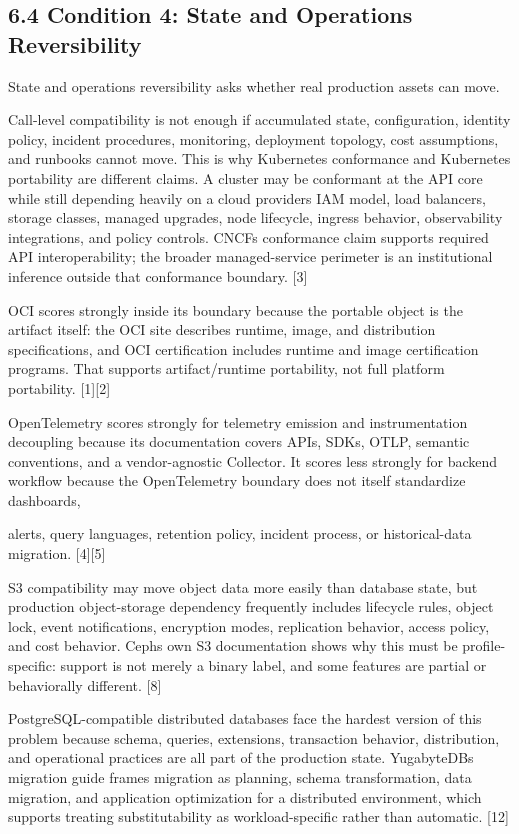 \documentclass[11pt]{article}
\begin{document}
\subsection{6.4 Condition 4: State and Operations Reversibility}\label{condition-4-state-and-operations-reversibility} State and operations reversibility asks whether real production assets can move.

Call-level compatibility is not enough if accumulated state, configuration, identity policy, incident procedures, monitoring, deployment topology, cost assumptions, and runbooks cannot move. This is why Kubernetes conformance and Kubernetes portability are different claims. A cluster may be conformant at the API core while still depending heavily on a cloud provider\textquotesingle s IAM model, load balancers, storage classes, managed upgrades, node lifecycle, ingress behavior, observability integrations, and policy controls. CNCF\textquotesingle s conformance claim supports required API interoperability; the broader managed-service perimeter is an institutional inference outside that conformance boundary. {[}3{]}

OCI scores strongly inside its boundary because the portable object is the artifact itself: the OCI site describes runtime, image, and distribution specifications, and OCI certification includes runtime and image certification programs. That supports artifact/runtime portability, not full platform portability. {[}1{]}{[}2{]}

OpenTelemetry scores strongly for telemetry emission and instrumentation decoupling because its documentation covers APIs, SDKs, OTLP, semantic conventions, and a vendor-agnostic Collector. It scores less strongly for backend workflow because the OpenTelemetry boundary does not itself standardize dashboards,

alerts, query languages, retention policy, incident process, or historical-data migration. {[}4{]}{[}5{]}

S3 compatibility may move object data more easily than database state, but production object-storage dependency frequently includes lifecycle rules, object lock, event notifications, encryption modes, replication behavior, access policy, and cost behavior. Ceph\textquotesingle s own S3 documentation shows why this must be profile-specific: support is not merely a binary label, and some features are partial or behaviorally different. {[}8{]}

PostgreSQL-compatible distributed databases face the hardest version of this problem because schema, queries, extensions, transaction behavior, distribution, and operational practices are all part of the production state. YugabyteDB\textquotesingle s migration guide frames migration as planning, schema transformation, data migration, and application optimization for a distributed environment, which supports treating substitutability as workload-specific rather than automatic. {[}12{]}
\end{document}
